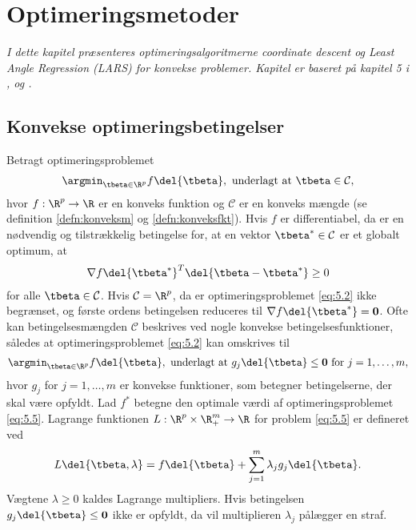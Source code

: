 \chapter{Optimeringsmetoder} \label{ch:optimeringsmetoder}
\textit{I dette kapitel præsenteres optimeringsalgoritmerne coordinate descent og Least Angle Regression (LARS) for konvekse problemer.
Kapitel er baseret på kapitel 5 i \citep{hastie}, \citep{glmnet1} og \citep{efron}.} 
%
\section{Konvekse optimeringsbetingelser}
Betragt optimeringsproblemet
\begin{align}
\argmin_{\tbeta \in \R^p} f \del{\tbeta}, \text{ underlagt at } \tbeta \in \mathcal{C}, \label{eq:5.2}
\end{align}
hvor \(f: \R^p \rightarrow \R\) er en konveks funktion og \(\mathcal{C}\) er en konveks mængde (se definition \ref{defn:konveksm} og \ref{defn:konveksfkt}).
Hvis \(f\) er differentiabel, da er en nødvendig og tilstrækkelig betingelse for, at en vektor \(\tbeta^* \in \mathcal{C}\) er et globalt optimum, at
\begin{align}
\nabla f \del{\tbeta^*}^T \del{ \tbeta - \tbeta^*} \geq 0 \label{eq:5.3}
\end{align}
for alle \(\tbeta \in \mathcal{C}\). 
Hvis \(\mathcal{C} = \R^p\), da er optimeringsproblemet \eqref{eq:5.2} ikke begrænset, og første ordens betingelsen reduceres til \(\nabla f \del{\tbeta^*} = \mathbf{0}\).
Ofte kan betingelsesmængden \(\mathcal{C}\) beskrives ved nogle konvekse betingelsesfunktioner, således at optimeringsproblemet \eqref{eq:5.2} kan omskrives til
\begin{align}
\argmin_{\tbeta \in \R^p} f \del{\tbeta}, \text{ underlagt at } g_j \del{\tbeta} \leq \mathbf{0} \text{ for } j = 1, \ldots, m, \label{eq:5.5}
\end{align}
hvor \(g_j\) for \(j=1, \ldots, m\) er konvekse funktioner, som betegner betingelserne, der skal være opfyldt.
Lad \(f^*\) betegne den optimale værdi af optimeringsproblemet \eqref{eq:5.5}.
Lagrange funktionen \(L: \R^p \times \R^m_+ \rightarrow \R\) for problem \eqref{eq:5.5} er defineret ved
\begin{align*}
L \del{\tbeta, \lambda} = f \del{\tbeta} + \sum_{j=1}^m \lambda_j g_j \del{\tbeta}.
\end{align*}
Vægtene \(\lambda \geq 0\) kaldes Lagrange multipliers.
Hvis betingelsen \(g_j \del{\tbeta} \leq \mathbf{0}\) ikke er opfyldt, da vil multiplieren \(\lambda_j\) pålægger en straf.
